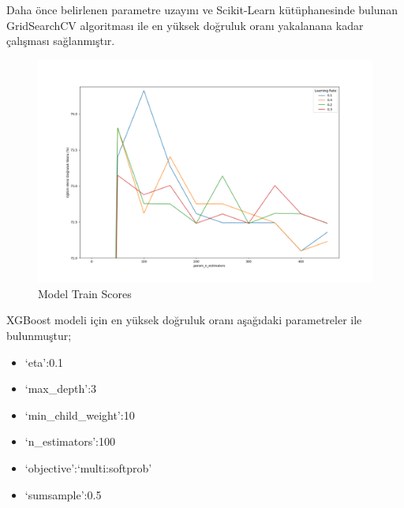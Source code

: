 \documentclass[12pt,twoside]{deuthesis}
\providecommand{\tightlist}{%
  \setlength{\itemsep}{0pt}\setlength{\parskip}{0pt}}
\begin{document}
Daha önce belirlenen parametre uzayını ve Scikit-Learn kütüphanesinde bulunan GridSearchCV algoritması ile en yüksek doğruluk oranı yakalanana kadar çalışması sağlanmıştır.
\begin{figure}

{\centering \includegraphics[width=1.1\linewidth,height=0.5\textheight]{figure/XGB_Grid_Graph} 

}

\caption{Model Train Scores}\label{fig:unnamed-chunk-30}
\end{figure}
XGBoost modeli için en yüksek doğruluk oranı aşağıdaki parametreler ile bulunmuştur;
\begin{itemize}
\tightlist
\item
  `eta':0.1
\item
  `max\_depth':3
\item
  `min\_child\_weight':10
\item
  `n\_estimators':100
\item
  `objective':`multi:softprob'
\item
  `sumsample':0.5
\end{itemize}
\newpage
\end{document}
